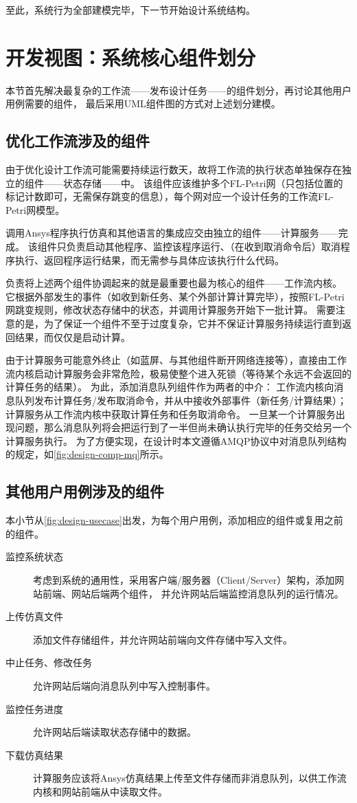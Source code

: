 \documentclass[index]{subfiles}
\begin{document}
至此，系统行为全部建模完毕，下一节开始设计系统结构。

\section{开发视图：系统核心组件划分}\label{sec:design-comp}
本节首先解决最复杂的工作流——发布设计任务——的组件划分，再讨论其他用户用例需要的组件，
最后采用UML组件图的方式对上述划分建模。

\subsection{优化工作流涉及的组件}\label{ssec:design-wf}
由于优化设计工作流可能需要持续运行数天，故将工作流的执行状态单独保存在独立的组件——状态存储——中。
该组件应该维护多个FL-Petri网（只包括位置的标记计数即可，无需保存跳变的信息），每个网对应一个设计任务的工作流FL-Petri网模型。

调用Ansys程序执行仿真和其他语言的集成应交由独立的组件——计算服务——完成。
该组件只负责启动其他程序、监控该程序运行、（在收到取消命令后）取消程序执行、返回程序运行结果，而无需参与具体应该执行什么代码。

负责将上述两个组件协调起来的就是最重要也最为核心的组件——工作流内核。
它根据外部发生的事件（如收到新任务、某个外部计算计算完毕），按照FL-Petri网跳变规则，修改状态存储中的状态，并调用计算服务开始下一批计算。
需要注意的是，为了保证一个组件不至于过度复杂，它并不保证计算服务持续运行直到返回结果，而仅仅是启动计算。

由于计算服务可能意外终止（如蓝屏、与其他组件断开网络连接等），直接由工作流内核启动计算服务会非常危险，极易使整个进入死锁（等待某个永远不会返回的计算任务的结果）。
为此，添加消息队列组件作为两者的中介：
工作流内核向消息队列发布计算任务/发布取消命令，并从中接收外部事件（新任务/计算结果）；
计算服务从工作流内核中获取计算任务和任务取消命令。
一旦某一个计算服务出现问题，那么消息队列将会把运行到了一半但尚未确认执行完毕的任务交给另一个计算服务执行。
为了方便实现，在设计时本文遵循AMQP协议中对消息队列结构的规定，如\cref{fig:design-comp-mq}所示。

\subsection{其他用户用例涉及的组件}
本小节从\cref{fig:design-usecase}出发，为每个用户用例，添加相应的组件或复用之前的组件。
\begin{description}
  \item[监控系统状态] 考虑到系统的通用性，采用客户端/服务器（Client/Server）架构，添加网站前端、网站后端两个组件，
    并允许网站后端监控消息队列的运行情况。
  \item[上传仿真文件] 添加文件存储组件，并允许网站前端向文件存储中写入文件。
  \item[中止任务、修改任务] 允许网站后端向消息队列中写入控制事件。
  \item[监控任务进度] 允许网站后端读取状态存储中的数据。
  \item[下载仿真结果] 计算服务应该将Ansys仿真结果上传至文件存储而非消息队列，以供工作流内核和网站前端从中读取文件。
\end{description}
\end{document}
